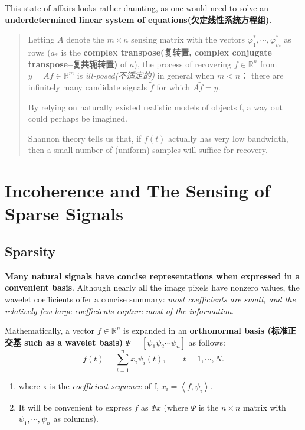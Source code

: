 This state of affairs looks rather daunting, as one would need to solve an \textbf{underdetermined linear system of equations(欠定线性系统方程组)}.
\begin{quote}
	Letting $A$ denote the $m \times n$ sensing matrix with the vectors $\varphi_1^*,\cdots,\varphi_m^*$ as rows (\textcolor[rgb]{1,0,0}{$a_*$} is the \textbf{\textcolor[rgb]{1,0,0}{complex transpose}(复转置, complex conjugate transpose--复共轭转置)} of $a$), the process of recovering $f\in\mathbb{R}^n$ from $y=Af\in\mathbb{R}^m$ is \emph{ill-posed(不适定的)} in general when $m<n$： there are infinitely many candidate signals $\tilde{f}$ for which $A\tilde{f}=y$.
	
	By relying on naturally existed realistic models of objects f, a way out could perhaps be imagined.

        Shannon theory tells us that, \textcolor[rgb]{1,0,0}{if $f(t)$ actually has very low bandwidth, then a small number of (uniform) samples will suffice for recovery}.
\end{quote}

\section{Incoherence and The Sensing of Sparse Signals}
\subsection{Sparsity}
\textbf{\textcolor[rgb]{1,0,0}{Many natural signals have concise representations when expressed in a convenient basis}}. Although nearly all the image pixels have nonzero values, the wavelet coefficients offer a concise summary: \emph{most coefficients are small, and the relatively few large coefficients capture most of the information}.

Mathematically, a vector $f\in\mathbb{R}^n$ is expanded in an \textbf{orthonormal basis (标准正交基 such as a wavelet basis)} $\Psi=\left[\psi_1\psi_2\cdots\psi_n\right]$ as follows:
\begin{equation}
\label{eq2}
f(t)=\sum\limits_{i=1}^{n}x_i\psi_i(t), \qquad t=1,\cdots,N.
\end{equation}
\begin{enumerate}
	\item where x is the \emph{coefficient sequence} of f, $x_i=\left<f,\psi_i\right>$.
	\item It will be convenient to express $f$ as $\Psi x$ (where $\Psi$ is the $n \times n$ matrix with $\psi_1,\cdots,\psi_n$ as columns).
\end{enumerate}

